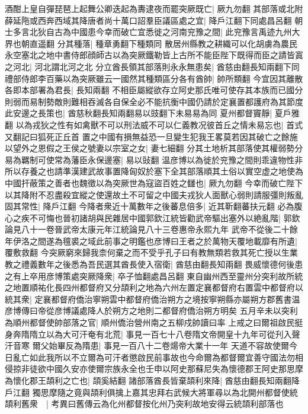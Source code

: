 酒酣上皇自彈琵琶上起舞公卿迭起為夀逮夜而罷突厥既亡|{
	厥九勿翻}
其部落或北附薛延陁或西奔西域其降唐者尚十萬口詔羣臣議區處之宜|{
	降戶江翻下同處昌呂翻}
朝士多言北狄自古為中國患今幸而破亡宜悉徙之河南兖豫之間|{
	此兖豫言禹迹九州大界也朝直遥翻}
分其種落|{
	種章勇翻下種類同}
散居州縣教之耕織可以化胡虜為農民永空塞北之地中書侍郎顔師古以為突厥鐵勒皆上古所不能臣陛下既得而臣之請皆寘之河北|{
	河北謂北河之北}
分立酋長領其部落則永永無患矣|{
	酋慈由翻長知兩翻下同}
禮部侍郎李百藥以為突厥雖云一國然其種類區分各有酋帥|{
	帥所類翻}
今宜因其離散各即本部署為君長|{
	長知兩翻}
不相臣屬縱欲存立阿史那氏唯可使存其本族而已國分則弱而易制勢敵則難相吞滅各自保全必不能抗衡中國仍請於定襄置都護府為其節度此安邊之長策也|{
	酋慈秋翻長知兩翻易以豉翻下未易易為同}
夏州都督竇靜|{
	夏戶雅翻}
以為戎狄之性有如禽獸不可以刑法威不可以仁義教况彼首丘之情未易忘也|{
	首式又翻記曰狐死正丘首}
置之中國有損無益恐一旦變生犯我王畧莫若因其破亡之餘施以望外之恩假之王侯之號妻以宗室之女|{
	妻七細翻}
分其土地析其部落使其權弱勢分易為羈制可使常為藩臣永保邊塞|{
	易以䜴翻}
温彦博以為徙於兖豫之間則乖違物性非所以存養之也請準漢建武故事置降匈奴於塞下全其部落順其土俗以實空虚之地使為中國扞蔽策之善者也魏徵以為突厥世為寇盜百姓之讎也|{
	厥九勿翻}
今幸而破亡陛下以其降附不忍盡殺宜縱之使還故土不可留之中國夫戎狄人面獸心弱則請服彊則叛亂固其常性|{
	降戶江翻}
今降者衆近十萬數年之後蕃息倍多|{
	近其靳翻蕃扶元翻}
必為腹心之疾不可悔也晉初諸胡與民雜居中國郭欽江統皆勸武帝驅出塞外以絶亂階|{
	郭欽論見八十一卷晉武帝太康元年江統論見八十三卷惠帝永熙九年}
武帝不從後二十餘年伊洛之間遂為氊裘之域此前事之明鑑也彦博曰王者之於萬物天覆地載靡有所遺|{
	覆敷救翻}
今突厥窮來歸我柰何棄之而不受乎孔子曰有教無類若救其死亡授以生業教之禮義數年之後悉為吾民選其酋長使入宿衛|{
	酋慈由翻長知兩翻}
畏威懷德何後患之有上卒用彦博策處突厥降衆|{
	卒子恤翻處昌呂翻}
東自幽州西至靈州分突利故所統之地置順祐化長四州都督府又分頡利之地為六州左置定襄都督府右置雲中都督府以統其衆|{
	定襄都督府僑治寧朔雲中都督府僑治朔方之境按寧朔縣亦屬朔方郡舊書温彦博傳曰帝從彦博議處降人於朔方之地則二都督府僑治朔方明矣}
五月辛未以突利為順州都督使帥部落之官|{
	順州僑治營州南之五柳戍帥讀曰率}
上戒之曰爾祖啟民挺身奔隋隋立以為大可汗奄有北荒|{
	事見一百七十八卷隋文帝開皇十九年可從刋入聲汗音寒}
爾父始畢反為隋患|{
	事見一百八十二卷煬帝大業十一年}
天道不容故使爾今日亂亡如此我所以不立爾為可汗者懲啟民前事故也今命爾為都督爾宜善守國法勿相侵掠非徒欲中國久安亦使爾宗族永全也壬申以阿史那蘇尼失為懷德郡王阿史那思摩為懷化郡王頡利之亡也|{
	頡奚結翻}
諸部落酋長皆棄頡利來降|{
	酋慈由翻長知兩翻降戶江翻}
獨思摩隨之竟與頡利俱擒上嘉其忠拜右武候大將軍尋以為北開州都督使統頡利舊衆　|{
	考異曰舊傳云為化州都督按化州乃突利故地安得云統頡利部落也}
